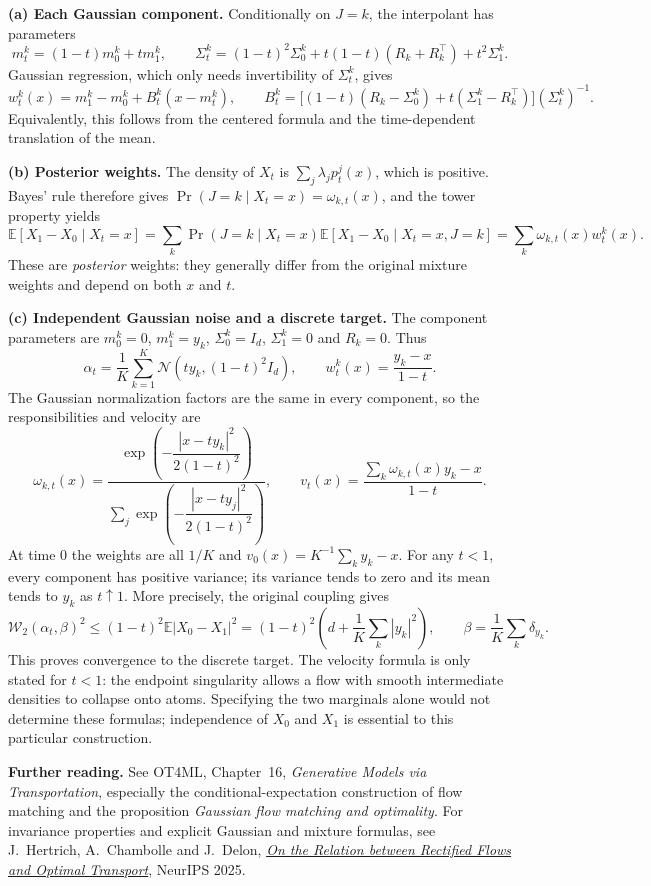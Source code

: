 \documentclass[11pt,a4paper]{article}
\theoremstyle{exostyle}
\newcommand{\Wtwo}{\mathcal{W}_2}
\newcommand{\EE}{\mathbb{E}}
\newcommand{\Gauss}{\mathcal{N}}
\begin{document}
\begin{solution}
\textbf{(a) Each Gaussian component.}
Conditionally on $J=k$, the interpolant has parameters
\[
  m_t^k=(1-t)m_0^k+tm_1^k,\qquad
  \Sigma_t^k=(1-t)^2\Sigma_0^k+t(1-t)(R_k+R_k^\top)+t^2\Sigma_1^k.
\]
Gaussian regression, which only needs invertibility of $\Sigma_t^k$,
gives
\[
  w_t^k(x)=m_1^k-m_0^k+B_t^k(x-m_t^k),\qquad
  B_t^k=\big[(1-t)(R_k-\Sigma_0^k)
                    +t(\Sigma_1^k-R_k^\top)\big](\Sigma_t^k)^{-1}.
\]
Equivalently, this follows from the centered formula and the
time-dependent translation of the mean.

\textbf{(b) Posterior weights.}
The density of $X_t$ is $\sum_j\lambda_jp_t^j(x)$, which is positive.
Bayes' rule therefore gives
$\Pr(J=k\mid X_t=x)=\omega_{k,t}(x)$, and the tower property yields
\[
  \EE[X_1-X_0\mid X_t=x]
  =\sum_k\Pr(J=k\mid X_t=x)
          \EE[X_1-X_0\mid X_t=x,J=k]
  =\sum_k\omega_{k,t}(x)w_t^k(x).
\]
These are \emph{posterior} weights: they generally differ from the
original mixture weights and depend on both $x$ and $t$.

\textbf{(c) Independent Gaussian noise and a discrete target.}
The component parameters are $m_0^k=0$, $m_1^k=y_k$,
$\Sigma_0^k=I_d$, $\Sigma_1^k=0$ and $R_k=0$. Thus
\[
  \alpha_t=\frac1K\sum_{k=1}^K\Gauss(ty_k,(1-t)^2I_d),\qquad
  w_t^k(x)=\frac{y_k-x}{1-t}.
\]
The Gaussian normalization factors are the same in every component,
so the responsibilities and velocity are
\[
  \omega_{k,t}(x)=
    \frac{\exp\!\left(-\dfrac{|x-ty_k|^2}{2(1-t)^2}\right)}
         {\sum_j\exp\!\left(-\dfrac{|x-ty_j|^2}{2(1-t)^2}\right)},
  \qquad
  v_t(x)=\frac{\sum_k\omega_{k,t}(x)y_k-x}{1-t}.
\]
At time $0$ the weights are all $1/K$ and
$v_0(x)=K^{-1}\sum_k y_k-x$. For any $t<1$, every component has
positive variance; its variance tends to zero and its mean tends
to $y_k$ as $t\uparrow1$. More precisely, the original coupling gives
\[
  \Wtwo(\alpha_t,\beta)^2
   \leq (1-t)^2\EE|X_0-X_1|^2
   =(1-t)^2\left(d+\frac1K\sum_k|y_k|^2\right),
  \qquad \beta=\frac1K\sum_k\delta_{y_k}.
\]
This proves convergence to the discrete target. The velocity formula
is only stated for $t<1$: the endpoint singularity allows a flow with
smooth intermediate densities to collapse onto atoms. Specifying the
two marginals alone would not determine these formulas; independence
of $X_0$ and $X_1$ is essential to this particular construction.
\end{solution}

\par\addvspace{8pt}
\textbf{Further reading.}
See OT4ML, Chapter~16, \emph{Generative Models via Transportation},
especially the conditional-expectation construction of flow matching
and the proposition \emph{Gaussian flow matching and optimality}.
For invariance properties and explicit Gaussian and mixture formulas,
see J.~Hertrich, A.~Chambolle and J.~Delon,
\href{https://arxiv.org/abs/2505.19712}{\emph{On the Relation between
Rectified Flows and Optimal Transport}}, NeurIPS 2025.
\end{document}
